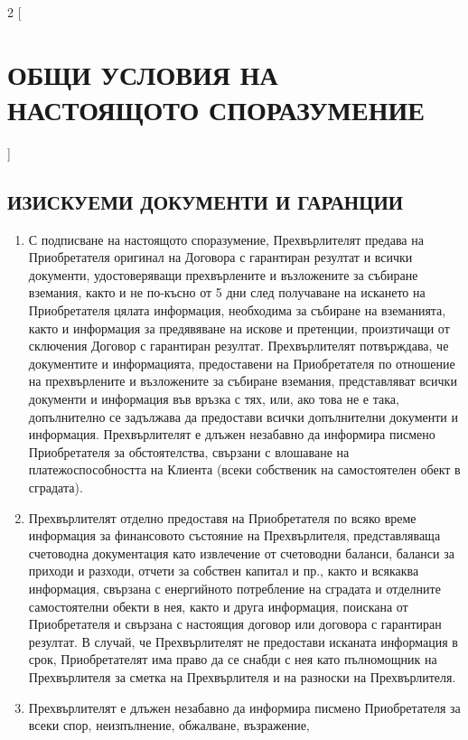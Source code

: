 \begin{multicols}{2} [\section{ОБЩИ УСЛОВИЯ НА НАСТОЯЩОТО
    СПОРАЗУМЕНИЕ}]

  \subsection{ИЗИСКУЕМИ ДОКУМЕНТИ И ГАРАНЦИИ}
  \begin{enumerate}
  \item С подписване на настоящото споразумение, Прехвърлителят
    предава на Приобретателя оригинал на Договора с гарантиран
    резултат и всички документи, удостоверяващи прехвърлените и
    възложените за събиране вземания, както и не по-късно от 5 дни
    след получаване на искането на Приобретателя цялата информация,
    необходима за събиране на вземанията, както и информация за
    предявяване на искове и претенции, произтичащи от сключения
    Договор с гарантиран резултат. Прехвърлителят потвърждава, че
    документите и информацията, предоставени на Приобретателя по
    отношение на прехвърлените и възложените за събиране вземания,
    представляват всички документи и информация във връзка с тях, или,
    ако това не е така, допълнително се задължава да предостави всички
    допълнителни документи и информация. Прехвърлителят е длъжен
    незабавно да информира писмено Приобретателя за обстоятелства,
    свързани с влошаване на платежоспособността на Клиента (всеки
    собственик на самостоятелен обект в сградата).
  \item Прехвърлителят отделно предоставя на Приобретателя по всяко
    време информация за финансовото състояние на Прехвърлителя,
    представляваща счетоводна документация като извлечение от
    счетоводни баланси, баланси за приходи и разходи, отчети за
    собствен капитал и пр., както и всякаква информация, свързана с
    енергийното потребление на сградата и отделните самостоятелни
    обекти в нея, както и друга информация, поискана от Приобретателя
    и свързана с настоящия договор или договора с гарантиран
    резултат. В случай, че Прехвърлителят не предостави исканата
    информация в срок, Приобретателят има право да се снабди с нея
    като пълномощник на Прехвърлителя за сметка на Прехвърлителя и на
    разноски на Прехвърлителя.
  \item Прехвърлителят е длъжен незабавно да информира писмено
    Приобретателя за всеки спор, неизпълнение, обжалване, възражение,

\end{enumerate}
\end{multicols}
